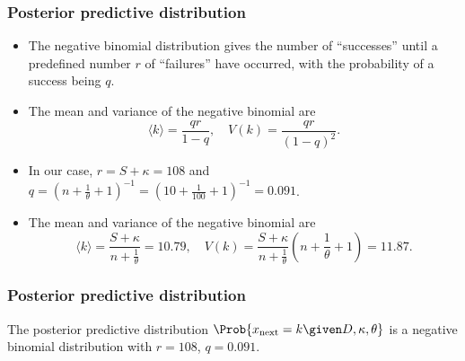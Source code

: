 \documentclass{slides}
\begin{document}
	\begin{frame}
		\frametitle{Posterior predictive distribution}
		\begin{itemize}
			\item The negative binomial distribution gives the number of ``successes'' until a predefined number $r$ of ``failures'' have occurred, with the probability of a success being $q$.
			\item The mean and variance of the negative binomial are \[\langle k \rangle = \frac{qr}{1-q}, \quad  V(k) = \frac{qr}{(1-q)^2}. \]
			\item In our case, $r=S+\kappa=108$ and $q=\left(n+\tfrac{1}{\theta} + 1\right)^{-1} = \left(10+\tfrac{1}{100} + 1\right)^{-1} = 0.091$.
			\item The mean and variance of the negative binomial are 
				\[\langle k \rangle = \frac{S+\kappa}{n+\tfrac{1}{\theta}} = 10.79, \quad  V(k) = \frac{S+\kappa}{n+\tfrac{1}{\theta}} (n + \frac{1}{\theta} + 1) = 11.87. \]
		\end{itemize}
	\end{frame}


	\begin{frame}
		\frametitle{Posterior predictive distribution}

		\hspace*{-5mm}
		

		The posterior predictive distribution $\Prob{x_{\textrm{next}}=k\given D, \kappa, \theta}$ is a negative binomial distribution with $r=108$, $q=0.091$.
	\end{frame}
\end{document}
